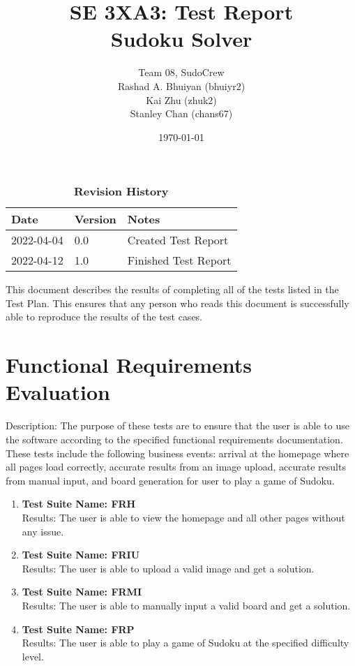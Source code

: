 \documentclass[11pt]{article}
\title{SE 3XA3: Test Report\\Sudoku Solver}
\author{Team 08, SudoCrew
		\\ Rashad A. Bhuiyan (bhuiyr2)
		\\ Kai Zhu (zhuk2)
		\\ Stanley Chan (chans67)
}
\date{\today}
\begin{document}
\maketitle

\tableofcontents
\listoftables
\listoffigures

\newpage

\begin{table}[H]
\caption{\bf Revision History}
\begin{tabularx}{\textwidth}{p{3cm}p{2cm}X}
\toprule {\bf Date} & {\bf Version} & {\bf Notes}\\
\midrule
2022-04-04 & 0.0 & Created Test Report\\
2022-04-12 & 1.0 & Finished Test Report\\
\bottomrule
\end{tabularx}
\end{table}

\newpage


This document describes the results of completing all of the tests listed in the Test Plan. This ensures that any person who reads this document is successfully able to reproduce the results of the test cases.

\section{Functional Requirements Evaluation}
Description: The purpose of these tests are to ensure that the user is able to use the software according to the specified functional requirements documentation. These tests include the following business events: arrival at the homepage where all pages load correctly, accurate results from an image upload, accurate results from manual input, and board generation for user to play a game of Sudoku.

\begin{enumerate}
    \item \textbf{Test Suite Name: FRH}\\
            Results: The user is able to view the homepage and all other pages without any issue.
            
    \item \textbf{Test Suite Name: FRIU}\\
            Results: The user is able to upload a valid image and get a solution.
    
    \item \textbf{Test Suite Name: FRMI}\\
            Results: The user is able to manually input a valid board and get a solution.
            
    \item \textbf{Test Suite Name: FRP}\\
            Results: The user is able to play a game of Sudoku at the specified difficulty level.
\end{enumerate}
\end{document}
